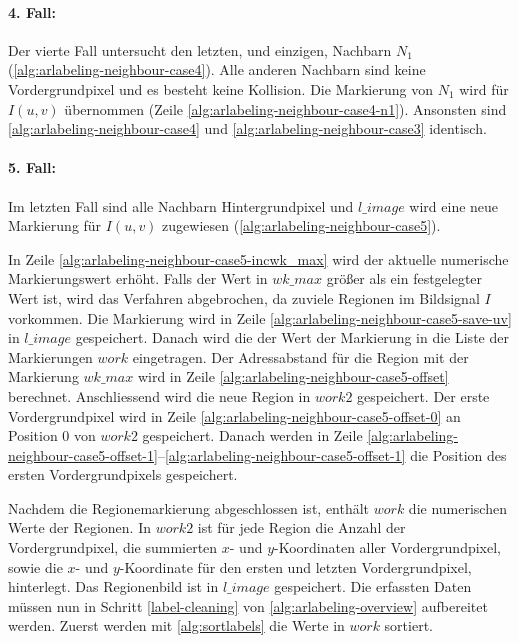
\paragraph{4. Fall:} %
\label{par:fall_4_}
Der vierte Fall untersucht den letzten, und einzigen, Nachbarn $N_1$ (\autoref{alg:arlabeling-neighbour-case4}). Alle
 anderen Nachbarn sind keine Vordergrundpixel und es besteht keine Kollision. Die Markierung von $N_1$ wird für
 $I(u,v)$ übernommen (Zeile \ref{alg:arlabeling-neighbour-case4-n1}). Ansonsten sind
 \autoref{alg:arlabeling-neighbour-case4} und \autoref{alg:arlabeling-neighbour-case3} identisch.




\paragraph{5. Fall:} %
\label{par:fall_5_}
Im letzten Fall sind alle Nachbarn Hintergrundpixel und $\mathit{l\_image}$ wird eine neue Markierung für $I(u,v)$
 zugewiesen (\autoref{alg:arlabeling-neighbour-case5}).



In Zeile \ref{alg:arlabeling-neighbour-case5-incwk_max} wird der aktuelle numerische Markierungswert erhöht. Falls der
 Wert in $\mathit{wk\_max}$ größer als ein festgelegter Wert ist, wird das Verfahren abgebrochen, da zuviele Regionen
 im Bildsignal $I$ vorkommen. Die Markierung wird in Zeile \ref{alg:arlabeling-neighbour-case5-save-uv} in
 $\mathit{l\_image}$ gespeichert. Danach wird die der Wert der Markierung in die Liste der Markierungen $\mathit{work}$
 eingetragen. Der Adressabstand für die Region mit der Markierung $\mathit{wk\_max}$ wird in Zeile
 \ref{alg:arlabeling-neighbour-case5-offset} berechnet. Anschliessend wird die neue Region in $\mathit{work2}$
 gespeichert. Der erste Vordergrundpixel wird in Zeile \ref{alg:arlabeling-neighbour-case5-offset-0} an Position $0$
 von $\mathit{work2}$ gespeichert. Danach werden in Zeile
 \ref{alg:arlabeling-neighbour-case5-offset-1}--\ref{alg:arlabeling-neighbour-case5-offset-1} die Position des ersten
 Vordergrundpixels gespeichert.


Nachdem die Regionemarkierung abgeschlossen ist, enthält $\mathit{work}$ die numerischen Werte der Regionen. In
 $\mathit{work2}$ ist für jede Region die Anzahl der Vordergrundpixel, die summierten $x$- und $y$-Koordinaten aller
 Vordergrundpixel, sowie die $x$- und $y$-Koordinate für den ersten und letzten Vordergrundpixel, hinterlegt. Das
 Regionenbild ist in $\mathit{l\_image}$ gespeichert. Die erfassten Daten müssen nun in Schritt \ref{label-cleaning} von
 \autoref{alg:arlabeling-overview} aufbereitet werden. Zuerst werden mit \autoref{alg:sortlabels} die Werte
 in $\mathit{work}$ sortiert.

